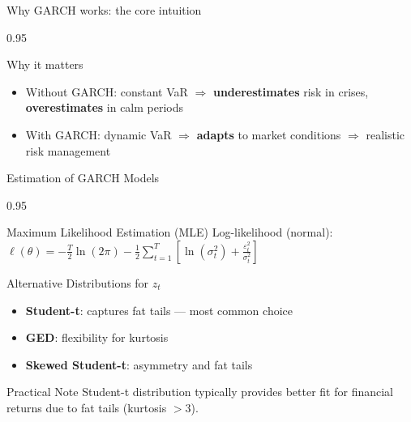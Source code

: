 \documentclass[9pt, aspectratio=169, t]{beamer}
\begin{document}
\begin{frame}{Why GARCH works: the core intuition}
\begin{cminipage}{0.95\textwidth}
{        \begin{alertblock}{Why it matters}
            \begin{itemize}\setlength{\itemsep}{0pt}
                \item Without GARCH: constant VaR $\Rightarrow$ \textbf{underestimates} risk in crises, \textbf{overestimates} in calm periods
                \item With GARCH: dynamic VaR $\Rightarrow$ \textbf{adapts} to market conditions $\Rightarrow$ realistic risk management
            \end{itemize}
        \end{alertblock}
        }
    \end{cminipage}
\end{frame}

\begin{frame}{Estimation of GARCH Models}
    \begin{cminipage}{0.95\textwidth}
    \small
    \begin{block}{Maximum Likelihood Estimation (MLE)}
        Log-likelihood (normal): $\ell(\theta) = -\frac{T}{2} \ln(2\pi) - \frac{1}{2} \sum_{t=1}^{T} \left[ \ln(\sigma_t^2) + \frac{\varepsilon_t^2}{\sigma_t^2} \right]$
    \end{block}

    \vspace{0.2cm}

    \begin{block}{Alternative Distributions for $z_t$}
        \begin{itemize}\setlength{\itemsep}{0pt}
            \item \textbf{Student-t}: captures fat tails --- most common choice
            \item \textbf{GED}: flexibility for kurtosis
            \item \textbf{Skewed Student-t}: asymmetry and fat tails
        \end{itemize}
    \end{block}

    \vspace{0.2cm}

    \begin{alertblock}{Practical Note}
        Student-t distribution typically provides better fit for financial returns due to fat tails (kurtosis $> 3$).
    \end{alertblock}
    \end{cminipage}
\end{frame}
\end{document}

